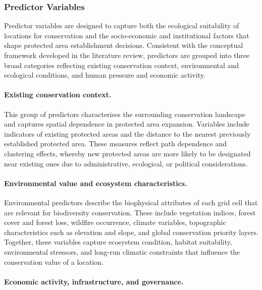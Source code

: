 \documentclass[12pt]{article}
\theoremstyle{break} %
\begin{document}
\subsubsection{Predictor Variables}
\label{predictor-variables}

Predictor variables are designed to capture both the ecological suitability of locations for conservation and the socio-economic and institutional factors that shape protected area establishment decisions. Consistent with the conceptual framework developed in the literature review, predictors are grouped into three broad categories reflecting existing conservation context, environmental and ecological conditions, and human pressure and economic activity.

\paragraph{Existing conservation context.}

This group of predictors characterises the surrounding conservation landscape and captures spatial dependence in protected area expansion. Variables include indicators of existing protected areas and the distance to the nearest previously established protected area. These measures reflect path dependence and clustering effects, whereby new protected areas are more likely to be designated near existing ones due to administrative, ecological, or political considerations.

\paragraph{Environmental value and ecosystem characteristics.}

Environmental predictors describe the biophysical attributes of each grid cell that are relevant for biodiversity conservation. These include vegetation indices, forest cover and forest loss, wildfire occurrence, climate variables, topographic characteristics such as elevation and slope, and global conservation priority layers. Together, these variables capture ecosystem condition, habitat suitability, environmental stressors, and long-run climatic constraints that influence the conservation value of a location.

\paragraph{Economic activity, infrastructure, and governance.}
\end{document}
